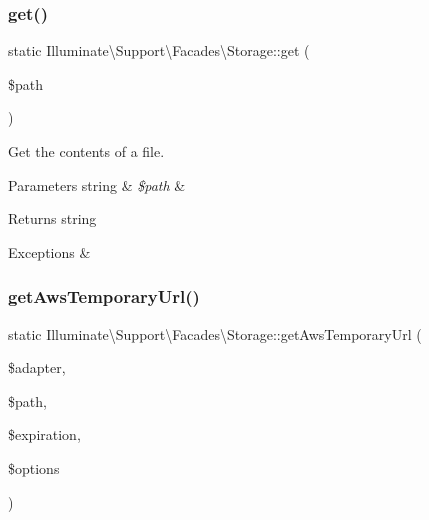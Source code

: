 \subsubsection{\texorpdfstring{get()}{get()}}
{\footnotesize\ttfamily static Illuminate\textbackslash{}\+Support\textbackslash{}\+Facades\textbackslash{}\+Storage\+::get (\begin{DoxyParamCaption}\item[{}]{\$path }\end{DoxyParamCaption})\hspace{0.3cm}{\ttfamily [static]}}

Get the contents of a file.


\begin{DoxyParams}[1]{Parameters}
string & {\em \$path} & \\
\hline
\end{DoxyParams}
\begin{DoxyReturn}{Returns}
string 
\end{DoxyReturn}

\begin{DoxyExceptions}{Exceptions}
{\em } & \\
\hline
\end{DoxyExceptions}
\mbox{\label{class_illuminate_1_1_support_1_1_facades_1_1_storage_afab583cc7fed1c7b29745a117afaa76c}} 
\subsubsection{\texorpdfstring{get\+Aws\+Temporary\+Url()}{getAwsTemporaryUrl()}}
{\footnotesize\ttfamily static Illuminate\textbackslash{}\+Support\textbackslash{}\+Facades\textbackslash{}\+Storage\+::get\+Aws\+Temporary\+Url (\begin{DoxyParamCaption}\item[{}]{\$adapter,  }\item[{}]{\$path,  }\item[{}]{\$expiration,  }\item[{}]{\$options }\end{DoxyParamCaption})\hspace{0.3cm}{\ttfamily [static]}}

